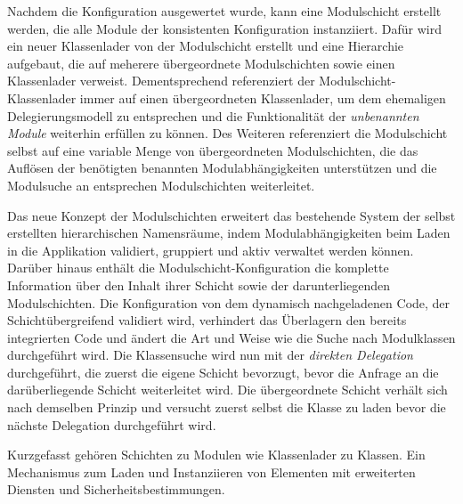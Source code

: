     Nachdem die Konfiguration ausgewertet wurde, kann eine Modulschicht erstellt werden, die alle Module der konsistenten Konfiguration instanziiert. Dafür wird ein neuer Klassenlader von der Modulschicht erstellt und eine Hierarchie aufgebaut, die auf meherere übergeordnete Modulschichten sowie einen Klassenlader verweist. Dementsprechend referenziert der Modulschicht-Klassenlader immer auf einen übergeordneten Klassenlader, um dem ehemaligen Delegierungsmodell zu entsprechen und die Funktionalität der \textit{unbenannten Module} weiterhin erfüllen zu können. Des Weiteren referenziert die Modulschicht selbst auf eine variable Menge von übergeordneten Modulschichten, die das Auflösen der benötigten benannten Modulabhängigkeiten unterstützen und die Modulsuche an entsprechen Modulschichten weiterleitet. \bigbreak

    Das neue Konzept der Modulschichten erweitert das bestehende System der selbst erstellten hierarchischen Namensräume, indem Modulabhängigkeiten beim Laden in die Applikation validiert, gruppiert und aktiv verwaltet werden können. Darüber hinaus enthält die Modulschicht-Konfiguration die komplette Information über den Inhalt ihrer Schicht sowie der darunterliegenden Modulschichten. \newline
    Die Konfiguration von dem dynamisch nachgeladenen Code, der Schichtübergreifend validiert wird, verhindert das Überlagern den bereits integrierten Code und ändert die Art und Weise wie die Suche nach Modulklassen durchgeführt wird. \newline
    Die Klassensuche wird nun mit der \textit{direkten Delegation} durchgeführt, die zuerst die eigene Schicht bevorzugt, bevor die Anfrage an die darüberliegende Schicht weiterleitet wird. Die übergeordnete Schicht verhält sich nach demselben Prinzip und versucht zuerst selbst die Klasse zu laden bevor die nächste Delegation durchgeführt wird. \bigbreak

    Kurzgefasst gehören Schichten zu Modulen wie Klassenlader zu Klassen. Ein Mechanismus zum Laden und Instanziieren von Elementen mit erweiterten Diensten und Sicherheitsbestimmungen.\cite{javaMod9,parentDelegationModel,modulMitJava9}

